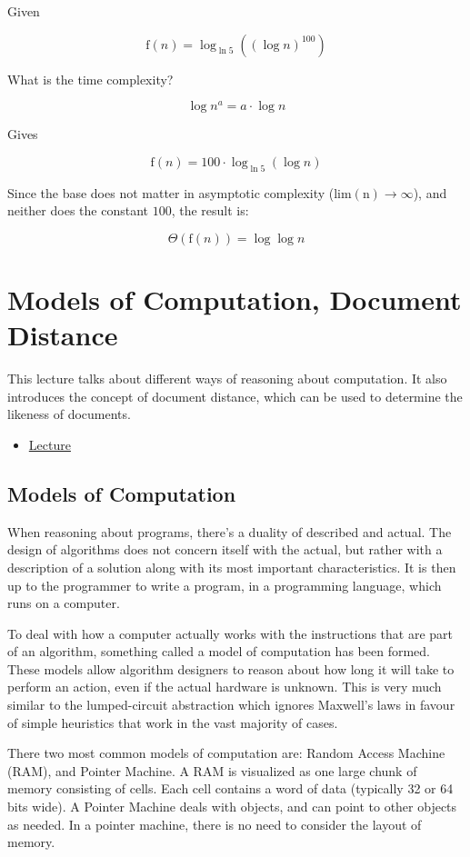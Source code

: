\documentclass{article}
\begin{document}
Given

$$
\textrm{f}(n) = \log_{\ln{5}}{\left(\left(\log{n}\right)^{100}\right)}
$$

What is the time complexity? 

$$
\log{n^a} = a\cdot \log{n}
$$

Gives

$$
\textrm{f}(n) = 100\cdot\log_{\ln{5}}{\left(\log{n}\right)}
$$

Since the base does not matter in asymptotic complexity ($\textrm{lim}(\textrm{n}) \rightarrow \infty$), and neither does the constant $100$, the result is:

$$
\Theta(\textrm{f}{(n)}) = \log{\log{n}}
$$

\section{Models of Computation, Document Distance}

This lecture talks about different ways of reasoning about computation. It also introduces the concept of document distance, which can be used to determine the likeness of documents.

\begin{itemize}
  \item \href{https://www.youtube.com/watch?v=Zc54gFhdpLA}{Lecture}
\end{itemize}

\subsection{Models of Computation}

When reasoning about programs, there's a duality of described and actual. The design of algorithms does not concern itself with the actual, but rather with a description of a solution along with its most important characteristics. It is then up to the programmer to write a program, in a programming language, which runs on a computer.

To deal with how a computer actually works with the instructions that are part of an algorithm, something called a model of computation has been formed. These models allow algorithm designers to reason about how long it will take to perform an action, even if the actual hardware is unknown. This is very much similar to the lumped-circuit abstraction which ignores Maxwell's laws in favour of simple heuristics that work in the vast majority of cases.

There two most common models of computation are: Random Access Machine (RAM), and Pointer Machine. A RAM is visualized as one large chunk of memory consisting of cells. Each cell contains a word of data (typically 32 or 64 bits wide). A Pointer Machine deals with objects, and can point to other objects as needed. In a pointer machine, there is no need to consider the layout of memory.
\end{document}
